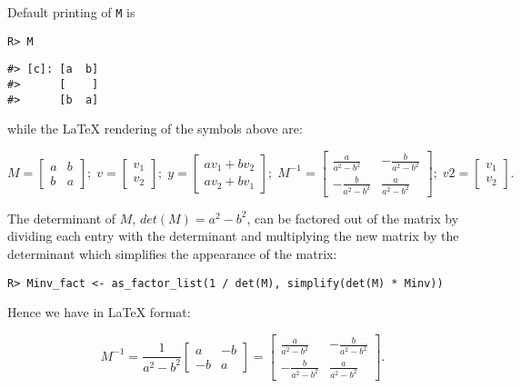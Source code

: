 Default printing of \texttt{M} is

\begin{verbatim}
R> M
\end{verbatim}

\begin{verbatim}
#> [c]: [a  b]
#>      [    ]
#>      [b  a]
\end{verbatim}

while the LaTeX rendering of the symbols above are:

\[
M = \left[\begin{matrix}a & b\\b & a\end{matrix}\right]; \; 
v = \left[\begin{matrix}v_{1}\\v_{2}\end{matrix}\right]; \;
y = \left[\begin{matrix}a v_{1} + b v_{2}\\a v_{2} + b v_{1}\end{matrix}\right]; \;
M^{-1} = \left[\begin{matrix}\frac{a}{a^{2} - b^{2}} & - \frac{b}{a^{2} - b^{2}}\\- \frac{b}{a^{2} - b^{2}} & \frac{a}{a^{2} - b^{2}}\end{matrix}\right]; \;
v2 = \left[\begin{matrix}v_{1}\\v_{2}\end{matrix}\right] . 
\]

The determinant of \(M\), \(det(M)=a^2 - b^2\), can be factored out of
the matrix by dividing each entry with the determinant and multiplying
the new matrix by the determinant which simplifies the appearance of
the matrix:

\begin{verbatim}
R> Minv_fact <- as_factor_list(1 / det(M), simplify(det(M) * Minv))
\end{verbatim}

Hence we have in LaTeX format:

\[
\quad M^{-1} = \frac{1}{a^{2} - b^{2}}  \left[\begin{matrix}a & - b\\- b & a\end{matrix}\right] = \left[\begin{matrix}\frac{a}{a^{2} - b^{2}} & - \frac{b}{a^{2} - b^{2}}\\- \frac{b}{a^{2} - b^{2}} & \frac{a}{a^{2} - b^{2}}\end{matrix}\right] .
\]

